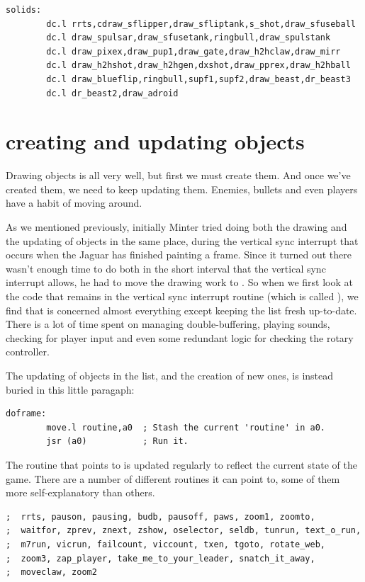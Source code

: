 \begin{lstlisting}
solids: 
        dc.l rrts,cdraw_sflipper,draw_sfliptank,s_shot,draw_sfuseball
        dc.l draw_spulsar,draw_sfusetank,ringbull,draw_spulstank
        dc.l draw_pixex,draw_pup1,draw_gate,draw_h2hclaw,draw_mirr
        dc.l draw_h2hshot,draw_h2hgen,dxshot,draw_pprex,draw_h2hball
        dc.l draw_blueflip,ringbull,supf1,supf2,draw_beast,dr_beast3
        dc.l dr_beast2,draw_adroid            
\end{lstlisting}

\section*{creating and updating objects}
Drawing objects is all very well, but first we must create them. And once we've
created them, we need to keep updating them. Enemies, bullets and even players
have a habit of moving around. 

As we mentioned previously, initially Minter tried doing both the drawing and the
updating of objects in the same place, during the vertical sync interrupt that
occurs when the Jaguar has finished painting a frame. Since it turned out there
wasn't enough time to do both in the short interval that the vertical sync interrupt
allows, he had to move the drawing work to . So when we first look at
the code that remains in the vertical sync interrupt routine (which is called
), we find that is concerned almost everything except keeping 
the  list fresh up-to-date. There is a lot of time spent
on managing double-buffering, playing sounds, checking for player input and even some
redundant logic for checking the rotary controller.

The updating of objects in the  list, and the creation of new ones,
is instead buried in this little paragaph:
\begin{lstlisting}
doframe:
        move.l routine,a0  ; Stash the current 'routine' in a0.
        jsr (a0)           ; Run it.
\end{lstlisting}

The routine that  points to is updated regularly to reflect the current
state of the game. There are a number of different routines it can point to, some of 
them more self-explanatory than others.
\begin{lstlisting}
;  rrts, pauson, pausing, budb, pausoff, paws, zoom1, zoomto,
;  waitfor, zprev, znext, zshow, oselector, seldb, tunrun, text_o_run,
;  m7run, vicrun, failcount, viccount, txen, tgoto, rotate_web,
;  zoom3, zap_player, take_me_to_your_leader, snatch_it_away,
;  moveclaw, zoom2
\end{lstlisting}

